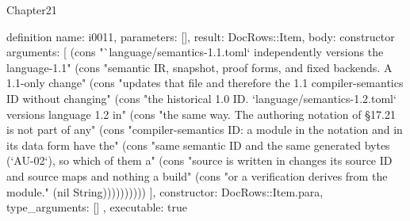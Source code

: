 \begin{lexlean}{Chapter21}
\begin{semanticmodule}
definition{
  name: i0011,
  parameters: [],
  result: DocRows::Item,
  body: constructor{
    arguments: [
      (cons "`language/semantics-1.1.toml` independently versions the language-1.1" (cons "semantic IR, snapshot, proof forms, and fixed backends. A 1.1-only change" (cons "updates that file and therefore the 1.1 compiler-semantics ID without changing" (cons "the historical 1.0 ID. `language/semantics-1.2.toml` versions language 1.2 in" (cons "the same way. The authoring notation of §17.21 is not part of any" (cons "compiler-semantics ID: a module in the notation and in its data form have the" (cons "same semantic ID and the same generated bytes (`AU-02`), so which of them a" (cons "source is written in changes its source ID and source maps and nothing a build" (cons "or a verification derives from the module." (nil String))))))))))
    ],
    constructor: DocRows::Item.para,
    type_arguments: []
  },
  executable: true
}


\end{semanticmodule}
\end{lexlean}

